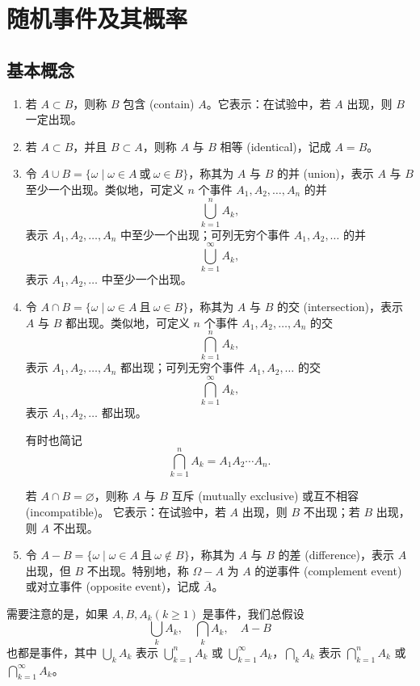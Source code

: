 \chapter{随机事件及其概率}
\section {基本概念}
\begin{enumerate}
  \item 若 $A \subset B$，则称 $B$ 包含 (contain) $A$。它表示：在试验中，若 $A$ 出现，则 $B$ 一定出现。
  \item 若 $A \subset B$，并且 $B \subset A$，则称 $A$ 与 $B$ 相等 (identical)，记成 $A=B$。
  \item 令 $A \cup B = \{\omega \mid \omega \in A \ \text{或} \ \omega \in B\}$，称其为 $A$ 与 $B$ 的并 (union)，表示 $A$ 与 $B$ 至少一个出现。类似地，可定义 $n$ 个事件 $A_1,A_2,\dots,A_n$ 的并
  \[
    \bigcup_{k=1}^n A_k,
  \]
  表示 $A_1,A_2,\dots,A_n$ 中至少一个出现；可列无穷个事件 $A_1,A_2,\dots$ 的并
  \[
    \bigcup_{k=1}^\infty A_k,
  \]
  表示 $A_1,A_2,\dots$ 中至少一个出现。
  \item 令 $A \cap B = \{\omega \mid \omega \in A \ \text{且} \ \omega \in B\}$，称其为 $A$ 与 $B$ 的交 (intersection)，表示 $A$ 与 $B$ 都出现。类似地，可定义 $n$ 个事件 $A_1,A_2,\dots,A_n$ 的交
  \[
    \bigcap_{k=1}^n A_k,
  \]
  表示 $A_1,A_2,\dots,A_n$ 都出现；可列无穷个事件 $A_1,A_2,\dots$ 的交
  \[
    \bigcap_{k=1}^\infty A_k,
  \]
  表示 $A_1,A_2,\dots$ 都出现。

  有时也简记
  \[
    \bigcap_{k=1}^n A_k = A_1 A_2 \cdots A_n.
  \]

  若 $A \cap B = \varnothing$，则称 $A$ 与 $B$ 互斥 (mutually exclusive) 或互不相容 (incompatible)。
  它表示：在试验中，若 $A$ 出现，则 $B$ 不出现；若 $B$ 出现，则 $A$ 不出现。
  \item 令 $A-B = \{\omega \mid \omega \in A \ \text{且} \ \omega \notin B\}$，称其为 $A$ 与 $B$ 的差 (difference)，表示 $A$ 出现，但 $B$ 不出现。特别地，称 $\Omega - A$ 为 $A$ 的逆事件 (complement event) 或对立事件 (opposite event)，记成 $\overline{A}$。
\end{enumerate}

需要注意的是，如果 $A, B, A_k(k \ge 1)$ 是事件，我们总假设
\[
\bigcup_k A_k,\quad \bigcap_k A_k,\quad A-B
\]
也都是事件，其中 $\bigcup_k A_k$ 表示 $\bigcup_{k=1}^n A_k$ 或 $\bigcup_{k=1}^\infty A_k$，$\bigcap_k A_k$ 表示 $\bigcap_{k=1}^n A_k$ 或 $\bigcap_{k=1}^\infty A_k$。

